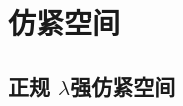 \documentclass[main.tex]{subfiles}
\begin{document}
	
	
\chapter{仿紧空间}\label{ch6}
	
	
	\section{正规	$\lambda$强仿紧空间}\label{sec:4.3}
	
\end{document}
